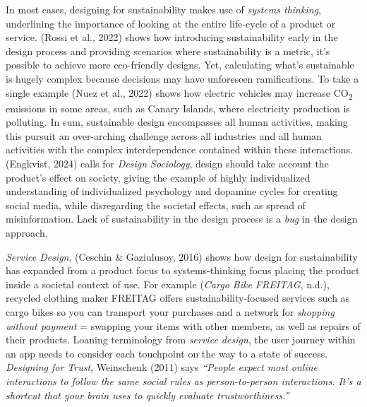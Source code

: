 \documentclass[
  12pt,
  letterpaper,
  DIV=11,
  numbers=noendperiod]{scrartcl}
\begin{document}
In most cases, designing for sustainability makes use of \emph{systems
thinking}, underlining the importance of looking at the entire
life-cycle of a product or service. (Rossi et al., 2022) shows how
introducing sustainability early in the design process and providing
scenarios where sustainability is a metric, it's possible to achieve
more eco-friendly designs. Yet, calculating what's sustainable is hugely
complex because decisions may have unforeseen ramifications. To take a
single example (Nuez et al., 2022) shows how electric vehicles may
increase CO\textsubscript{2} emissions in some areas, such as Canary
Islands, where electricity production is polluting. In sum, sustainable
design encompasses all human activities, making this pursuit an
over-arching challenge across all industries and all human activities
with the complex interdependence contained within these interactions.
(Engkvist, 2024) calls for \emph{Design Sociology}, design should take
account the product's effect on society, giving the example of highly
individualized understanding of individualized psychology and dopamine
cycles for creating social media, while disregarding the societal
effects, such as spread of misinformation. Lack of sustainability in the
design process is a \emph{bug} in the design approach.

\emph{Service Design}, (Ceschin \& Gaziulusoy, 2016) shows how design
for sustainability has expanded from a product focus to systems-thinking
focus placing the product inside a societal context of use. For example
(\emph{Cargo Bike {\textbar} {FREITAG}}, n.d.), recycled clothing maker
FREITAG offers sustainability-focused services such as cargo bikes so
you can transport your purchases and a network for \emph{shopping
without payment} = swapping your items with other members, as well as
repairs of their products. Loaning terminology from \emph{service
design}, the user journey within an app needs to consider each
touchpoint on the way to a state of success. \emph{Designing for Trust},
Weinschenk (2011) says \emph{``People expect most online interactions to
follow the same social rules as person-to-person interactions. It's a
shortcut that your brain uses to quickly evaluate trustworthiness.''}
\end{document}
